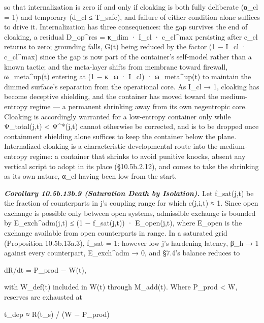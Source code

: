 \documentclass[
]{article}
\begin{document}
so that internalization is zero if and only if cloaking is both fully
deliberate (α\_cl = 1) and temporary (d\_cl ≤ T\_safe), and failure of
either condition alone suffices to drive it. Internalization has three
consequences: the gap survives the end of cloaking, a residual
D\_op\^{}res = κ\_dim · I\_cl · c\_cl\^{}max persisting after c\_cl
returns to zero; grounding falls, G(t) being reduced by the factor (1 −
I\_cl · c\_cl\^{}max) since the gap is now part of the container's
self-model rather than a known tactic; and the meta-layer shifts from
membrane toward firewall, ω\_meta\^{}up(t) entering at (1 − κ\_ω ·
I\_cl) · ω\_meta\^{}up(t) to maintain the dimmed surface's separation
from the operational core. As I\_cl → 1, cloaking has become deceptive
shielding, and the container has moved toward the medium-entropy regime
--- a permanent shrinking away from its own negentropic core. Cloaking is
accordingly warranted for a low-entropy container only while
Ψ\_total(j,t) \textless{} Ψ\^{}*(j,t) cannot otherwise be corrected,
and is to be dropped once containment shielding alone suffices to keep
the container below the plane. Internalized cloaking is a characteristic
developmental route into the medium-entropy regime: a container that
shrinks to avoid punitive knocks, absent any vertical script to adopt in
its place (§10.5b.2.12), and comes to take the shrinking as its own
nature, α\_cl having been low from the start.

\emph{\textbf{Corollary 10.5b.13b.9 (Saturation Death by Isolation).}}
Let f\_sat(j,t) be the fraction of counterparts in j's coupling range
for which c(j,i,t) ≈ 1. Since open exchange is possible only between
open systems, admissible exchange is bounded by E\_exch\^{}adm(j,t) ≤
(1 − f\_sat(j,t)) · Ē\_open(j,t), where Ē\_open is the exchange
available from open counterparts in range. In a saturated grid
(Proposition 10.5b.13a.3), f\_sat = 1: however low j's hardening latency,
β\_h → 1 against every counterpart, E\_exch\^{}adm → 0, and §7.4's balance
reduces to

dR/dt = P\_prod − W(t),

with W\_def(t) included in W(t) through M\_add(t). Where P\_prod
\textless{} W, reserves are exhausted at

t\_dep ≈ R(t\_s) / (W − P\_prod)
\end{document}
